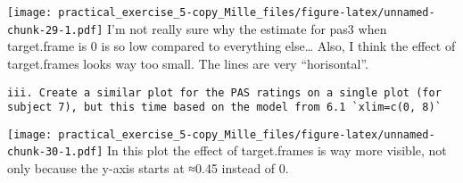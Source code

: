 \documentclass[
]{article}
\newenvironment{Shaded}{\begin{snugshade}}{\end{snugshade}}
\newcommand{\AttributeTok}[1]{\textcolor[rgb]{0.77,0.63,0.00}{#1}}
\newcommand{\CommentTok}[1]{\textcolor[rgb]{0.56,0.35,0.01}{\textit{#1}}}
\newcommand{\FunctionTok}[1]{\textcolor[rgb]{0.00,0.00,0.00}{#1}}
\newcommand{\NormalTok}[1]{#1}
\newcommand{\OtherTok}[1]{\textcolor[rgb]{0.56,0.35,0.01}{#1}}
\newcommand{\SpecialCharTok}[1]{\textcolor[rgb]{0.00,0.00,0.00}{#1}}
\newcommand{\StringTok}[1]{\textcolor[rgb]{0.31,0.60,0.02}{#1}}
\begin{document}
\texttt{[image: practical\_exercise\_5-copy\_Mille\_files/figure-latex/unnamed-chunk-29-1.pdf]}
I'm not really sure why the estimate for pas3 when target.frame is 0 is
so low compared to everything else\ldots{} Also, I think the effect of
target.frames looks way too small. The lines are very ``horisontal''.

\begin{verbatim}
iii. Create a similar plot for the PAS ratings on a single plot (for subject 7), but this time based on the model from 6.1 `xlim=c(0, 8)` 
\end{verbatim}

\begin{Shaded}
\end{Shaded}

\texttt{[image: practical\_exercise\_5-copy\_Mille\_files/figure-latex/unnamed-chunk-30-1.pdf]}
In this plot the effect of target.frames is way more visible, not only
because the y-axis starts at ≈0.45 instead of 0.
\end{document}
